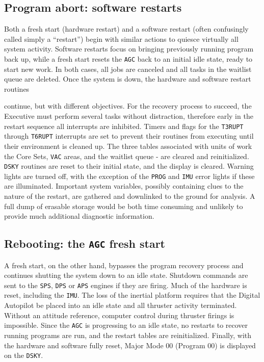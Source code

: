\documentclass[refcap, oxford]{ahsan}
\begin{document}
\subsection{Program abort: software restarts}
Both a fresh start (hardware restart) and a software restart (often confusingly called simply a ``restart'') begin with similar actions to quiesce virtually all system activity. Software restarts focus on bringing previously running program back up, while a fresh start resets the \texttt{AGC} back to an initial idle state, ready to start new work. In both cases, all jobs are canceled and all tasks in the waitlist queue are deleted. Once the system is down, the hardware and software restart routines

continue, but with different objectives. For the recovery process to succeed, the Executive must perform several tasks without distraction, therefore early in the restart sequence all interrupts are inhibited. Timers and flags for the \texttt{T3RUPT} through \texttt{T6RUPT} interrupts are set to prevent their routines from executing until their environment is cleaned up. The three tables associated with units of work the Core Sets, \texttt{VAC} areas, and the waitlist queue - are cleared and reinitialized. \texttt{DSKY} routines are reset to their initial state, and the display is cleared. Warning lights are turned off, with the exception of the \texttt{PROG} and \texttt{IMU} error lights if these are illuminated. Important system variables, possibly containing clues to the nature of the restart, are gathered and downlinked to the ground for analysis. A full dump of erasable storage would be both time consuming and unlikely to provide much additional diagnostic information.


\subsection{Rebooting: the \texttt{AGC} fresh start}
A fresh start, on the other hand, bypasses the program recovery process and continues shutting the system down to an idle state. Shutdown commands are sent to the \texttt{SPS}, \texttt{DPS} or \texttt{APS} engines if they are firing. Much of the hardware is reset, including the \texttt{IMU}. The loss of the inertial platform requires that the Digital Autopilot be placed into an idle state and all thruster activity terminated. Without an attitude reference, computer control during thruster firings is impossible. Since the \texttt{AGC} is progressing to an idle state, no restarts to recover running programs are run, and the restart tables are reinitialized. Finally, with the hardware and software fully reset, Major Mode 00 (Program 00) is displayed on the \texttt{DSKY}.
\end{document}
